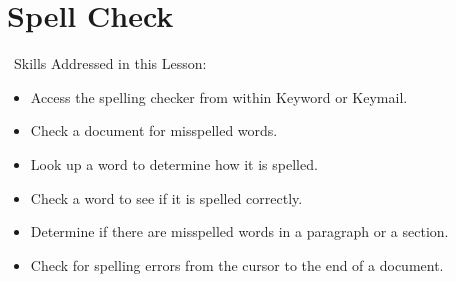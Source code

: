 \documentclass[10pt,letterpaper,twoside]{report}
\begin{document}
{{{\section{ Spell Check}
\
Skills Addressed in this Lesson:
\begin{itemize}
	\item Access the spelling checker from within Keyword or Keymail.
	\item Check a document for misspelled words.
	\item Look up a word to determine how it is spelled.
	\item Check a word to see if it is spelled correctly.
	\item Determine if there are misspelled words in a paragraph or a section.
	\item Check for spelling errors from the cursor to the end of a document.
\end{itemize}

}}}
\end{document}

